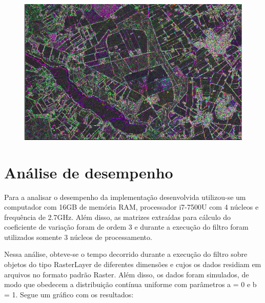 \documentclass[12pt]{article}
\begin{document}
\begin{figure}[!h]
	\begin{center}    
		\includegraphics[width = 130mm, scale = 0.5]{../../Images/Report_29_08_18/foulum_cv_reduced.png} \\ 
 	\end{center}
\end{figure}

\newpage

\section{Análise de desempenho}

Para a analisar o desempenho da implementação desenvolvida utilizou-se um computador com 16GB de memória RAM, processador i7-7500U com 4 núcleos e frequência de 2.7GHz. Além disso, as matrizes extraídas para cálculo do coeficiente de variação foram de ordem 3 e durante a execução do filtro foram utilizados somente 3 núcleos de processamento.

Nessa análise, obteve-se o tempo decorrido durante a execução do filtro sobre objetos do tipo RasterLayer de diferentes dimensões e cujos os dados residiam em arquivos no formato padrão Raster. Além disso, os dados foram simulados, de modo que obedecem a distribuição contínua uniforme com parâmetros a = 0 e b = 1. Segue um gráfico com os resultados:
\end{document}
